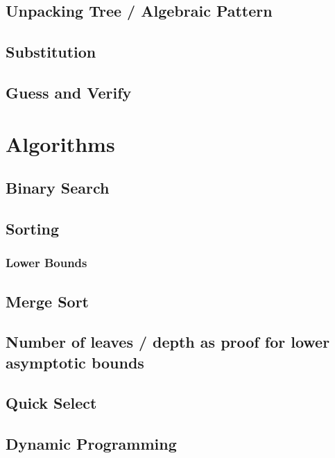 \documentclass[12pt]{article}
\theoremstyle{definition}
\begin{document}
	\subsection{Unpacking Tree / Algebraic Pattern}

	\subsection{Substitution}

	\subsection{Guess and Verify}


	\section{Algorithms}

	\subsection{Binary Search}

	\subsection{Sorting}

	\subsubsection{Lower Bounds}

	\subsection{Merge Sort}

	\subsection{Number of leaves / depth as proof for lower asymptotic bounds}

	\subsection{Quick Select}

	\subsection{Dynamic Programming}
\end{document}
